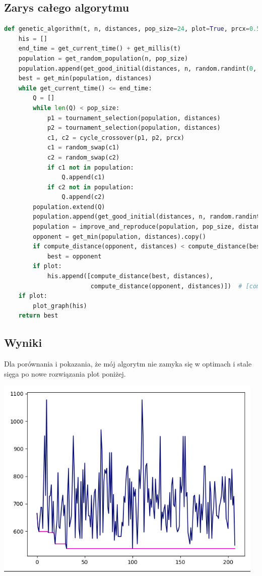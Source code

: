 \documentclass[11pt]{article}
\begin{document}
\subsection{Zarys całego algorytmu}
\begin{lstlisting}[language=Python]
def genetic_algorithm(t, n, distances, pop_size=24, plot=True, prcx=0.5):
    his = []
    end_time = get_current_time() + get_millis(t)
    population = get_random_population(n, pop_size)
    population.append(get_good_initial(distances, n, random.randint(0, n - 1)))
    best = get_min(population, distances)
    while get_current_time() <= end_time:
        Q = []
        while len(Q) < pop_size:
            p1 = tournament_selection(population, distances)
            p2 = tournament_selection(population, distances)
            c1, c2 = cycle_crossover(p1, p2, prcx)
            c1 = random_swap(c1)
            c2 = random_swap(c2)
            if c1 not in population:
                Q.append(c1)
            if c2 not in population:
                Q.append(c2)
        population.extend(Q)
        population.append(get_good_initial(distances, n, random.randint(0, n - 1)))
        population = improve_and_reproduce(population, pop_size, distances)
        opponent = get_min(population, distances).copy()
        if compute_distance(opponent, distances) < compute_distance(best, distances):
            best = opponent
        if plot:
            his.append([compute_distance(best, distances),
                        compute_distance(opponent, distances)])  # [compute_distance(x, distances) for x in population])
    if plot:
        plot_graph(his)
    return best
\end{lstlisting}
\subsection{Wyniki}
Dla porównania i pokazania, że mój algorytm nie zamyka się w optimach i stale sięga po nowe rozwiązania plot poniżej.
\begin{center}
\includegraphics[scale=.7]{resultsga.png}
\end{center}
\end{document}
